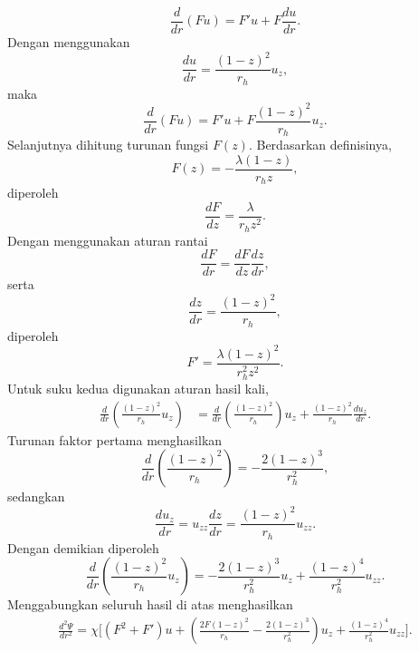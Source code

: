 \begin{equation} \frac{d}{dr} (Fu) = F'u + F \frac{du}{dr}. \end{equation}
Dengan menggunakan
\begin{equation} \frac{du}{dr} = \frac{(1-z)^2}{r_h} u_z, \end{equation}
maka
\begin{equation} \frac{d}{dr} (Fu) = F'u + F \frac{(1-z)^2}{r_h} u_z. \end{equation}
Selanjutnya dihitung turunan fungsi $F(z)$. Berdasarkan definisinya,
\begin{equation} F(z) = -\frac{\lambda(1-z)}{r_hz}, \end{equation}
diperoleh
\begin{equation} \frac{dF}{dz} = \frac{\lambda}{r_hz^2}. \end{equation}
Dengan menggunakan aturan rantai
\begin{equation} \frac{dF}{dr} = \frac{dF}{dz} \frac{dz}{dr}, \end{equation}
serta
\begin{equation} \frac{dz}{dr} = \frac{(1-z)^2}{r_h}, \end{equation}
diperoleh
\begin{equation} \boxed{ F' = \frac{\lambda(1-z)^2} {r_h^2z^2}. } \end{equation}
Untuk suku kedua digunakan aturan hasil kali,
\begin{align} \frac{d}{dr} \left( \frac{(1-z)^2}{r_h} u_z \right) &= \frac{d}{dr} \left( \frac{(1-z)^2}{r_h} \right) u_z + \frac{(1-z)^2}{r_h} \frac{du_z}{dr}. \end{align}
Turunan faktor pertama menghasilkan
\begin{equation} \frac{d}{dr} \left( \frac{(1-z)^2}{r_h} \right) = -\frac{2(1-z)^3}{r_h^2}, \end{equation}
sedangkan
\begin{equation} \frac{du_z}{dr} = u_{zz} \frac{dz}{dr} = \frac{(1-z)^2}{r_h} u_{zz}. \end{equation}
Dengan demikian diperoleh
\begin{equation} \frac{d}{dr} \left( \frac{(1-z)^2}{r_h} u_z \right) = -\frac{2(1-z)^3}{r_h^2} u_z + \frac{(1-z)^4}{r_h^2} u_{zz}. \end{equation}
Menggabungkan seluruh hasil di atas menghasilkan
\begin{align} \frac{d^2\Psi}{dr^2} = \chi \Biggl[ (F^2+F')u + \left( \frac{2F(1-z)^2}{r_h} - \frac{2(1-z)^3}{r_h^2} \right) u_z + \frac{(1-z)^4}{r_h^2} u_{zz} \Biggr]. \end{align}
